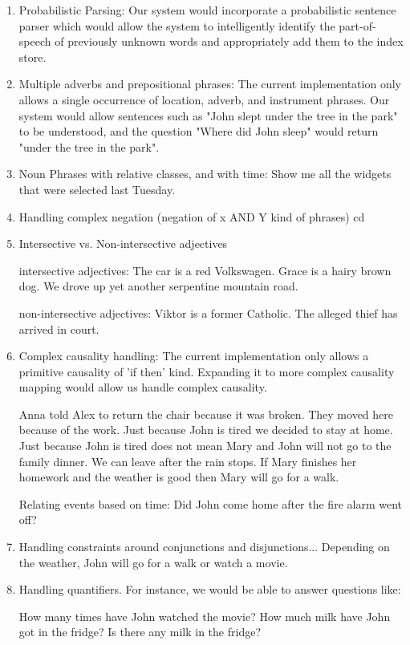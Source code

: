 \documentclass[10pt]{article}
\begin{document}
\begin{enumerate}
\item{
Probabilistic Parsing: Our system would incorporate a probabilistic sentence parser which would allow the system to intelligently identify the part-of-speech of previously unknown words and appropriately add them to the index store.
}

\item{
Multiple adverbs and prepositional phrases: The current implementation only allows a single occurrence of location, adverb, and instrument phrases. Our system would allow sentences such as "John slept under the tree in the park" to be understood, and the question "Where did John sleep" would return "under the tree in the park".
}

\item{
Noun Phrases with relative classes, and with time:  Show me all the widgets that were selected last Tuesday.
}

\item{
Handling complex negation (negation of x AND Y kind of phrases)
}cd 

\item{
Intersective vs. Non-intersective adjectives

intersective adjectives:
The car is a red Volkswagen.
Grace is a hairy brown dog.
We drove up yet another serpentine mountain road.

non-intersective adjectives:
Viktor is a former Catholic.
The alleged thief has arrived in court.
}

\item{
Complex causality handling: The current implementation only allows a primitive causality of 'if then' kind. Expanding it to more complex causality mapping would allow us handle complex causality.

Anna told Alex to return the chair because it was broken. 
They moved here because of the work.
Just because John is tired we decided to stay at home.
Just because John is tired does not mean Mary and John will not go to the family dinner.
We can leave after the rain stops.
If Mary finishes her homework and the weather is good then Mary will go for a walk.

Relating events based on time:
Did John come home after the fire alarm went off?

}

\item{
Handling constraints around conjunctions and disjunctions...
Depending on the weather, John will go for a walk or watch a movie.
}

\item{
Handling quantifiers. For instance, we would be able to answer questions like: 

How many times have John watched the movie?
How much milk have John got in the fridge?
Is there any milk in the fridge?

}

\end{enumerate}
\end{document}
